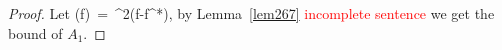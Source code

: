 \documentclass[twoside,11pt]{article}
\begin{document}
\begin{proof}
Let 
    \bea 
    \ell(f) \,=\,   \Delta^2(f-f^*),
    \bea    by Lemma~\ref{lem267} \textcolor{red}{incomplete sentence}   
    we get the bound of $A_1$.





\end{proof}
\end{document}
